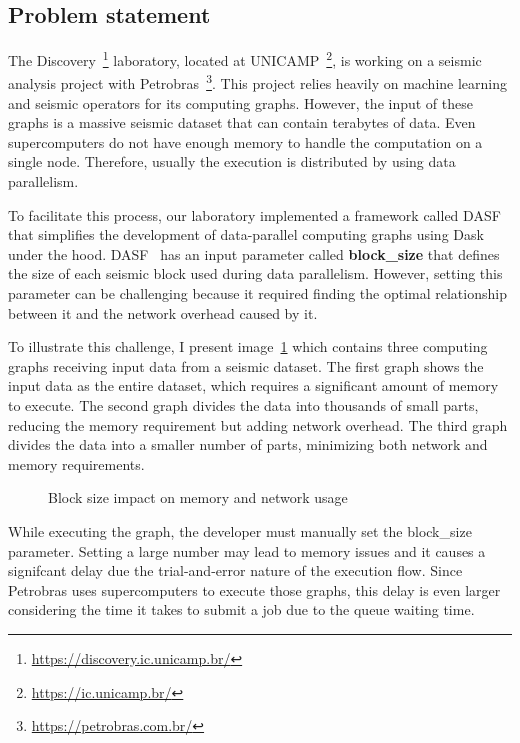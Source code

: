 \subsection{Problem statement}
\label{subsec:problem-statement}

The Discovery~\footnote{\url{https://discovery.ic.unicamp.br/}} laboratory, located at \ac{UNICAMP}~\footnote{\url{https://ic.unicamp.br/}}, is working on a seismic analysis project with Petrobras~\footnote{\url{https://petrobras.com.br/}}.
This project relies heavily on machine learning and seismic operators for its computing graphs.
However, the input of these graphs is a massive seismic dataset that can contain terabytes of data.
Even supercomputers do not have enough memory to handle the computation on a single node.
Therefore, usually the execution is distributed by using data parallelism.

To facilitate this process, our laboratory implemented a framework called \ac{DASF}~\cite{dasf} that simplifies the development of data-parallel computing graphs using Dask~\cite{dask} under the hood.
\ac{DASF}~\cite{dasf} has an input parameter called \textbf{block\_size} that defines the size of each seismic block used during data parallelism.
However, setting this parameter can be challenging because it required finding the optimal relationship between it and the network overhead caused by it.

To illustrate this challenge, I present image~\ref{fig:block-size} which contains three computing graphs receiving input data from a seismic dataset.
The first graph shows the input data as the entire dataset, which requires a significant amount of memory to execute.
The second graph divides the data into thousands of small parts, reducing the memory requirement but adding network overhead.
The third graph divides the data into a smaller number of parts, minimizing both network and memory requirements.

\begin{figure}[ht]
  \caption{Block size impact on memory and network usage}
  \label{fig:block-size}
\end{figure}

While executing the graph, the developer must manually set the block\_size parameter.
Setting a large number may lead to memory issues and it causes a signifcant delay due the trial-and-error nature of the execution flow.
Since Petrobras uses supercomputers to execute those graphs, this delay is even larger considering the time it takes to submit a job due to the queue waiting time.

